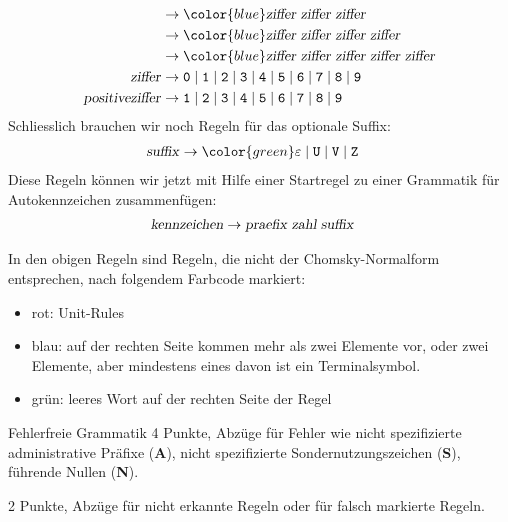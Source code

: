 \begin{loesung}
\begin{teilaufgaben}
\begin{align*}
&\rightarrow
{\color{blue}
\text{\textsl{ziffer}}\;
\text{\textsl{ziffer}}\;
\text{\textsl{ziffer}}}
\\
&\rightarrow
{\color{blue}
\text{\textsl{ziffer}}\;
\text{\textsl{ziffer}}\;
\text{\textsl{ziffer}}\;
\text{\textsl{ziffer}}}
\\
&\rightarrow
{\color{blue}
\text{\textsl{ziffer}}\;
\text{\textsl{ziffer}}\;
\text{\textsl{ziffer}}\;
\text{\textsl{ziffer}}\;
\text{\textsl{ziffer}}}
\\
\text{\textsl{ziffer}}
&\rightarrow
{\tt 0}\mid 
{\tt 1}\mid 
{\tt 2}\mid 
{\tt 3}\mid 
{\tt 4}\mid 
{\tt 5}\mid 
{\tt 6}\mid 
{\tt 7}\mid 
{\tt 8}\mid 
{\tt 9}
\\
\text{\textsl{positiveziffer}}
&\rightarrow
{\tt 1}\mid 
{\tt 2}\mid 
{\tt 3}\mid 
{\tt 4}\mid 
{\tt 5}\mid 
{\tt 6}\mid 
{\tt 7}\mid 
{\tt 8}\mid 
{\tt 9}
\\
\end{align*}
Schliesslich brauchen wir noch Regeln für das optionale Suffix:
\begin{align*}
\text{\textsl{suffix}}
&\rightarrow{\color{green}\varepsilon} \mid 
{\tt U} \mid 
{\tt V} \mid 
{\tt Z}
\end{align*}
Diese Regeln können wir jetzt mit Hilfe einer Startregel zu einer
Grammatik für Autokennzeichen zusammenfügen:
\begin{align*}
\text{\textsl{kennzeichen}}&\rightarrow
\text{\textsl{praefix}}\;\text{\textsl{zahl}}\;\text{\textsl{suffix}}
\end{align*}
\item In den obigen Regeln sind Regeln, die nicht der Chomsky-Normalform
entsprechen, nach folgendem Farbcode markiert:
\begin{itemize}
\item {\color{red} rot}: Unit-Rules
\item {\color{blue} blau}: auf der rechten Seite kommen mehr als
zwei Elemente vor, oder zwei Elemente, aber mindestens eines davon
ist ein Terminalsymbol.
\item {\color{green} grün}: leeres Wort auf der rechten Seite der Regel
\qedhere
\end{itemize}
\end{teilaufgaben}
\end{loesung}

\begin{bewertung}
\begin{teilaufgaben}
\item Fehlerfreie Grammatik 4 Punkte, Abzüge für Fehler wie
nicht spezifizierte administrative Präfixe ({\bf A}), nicht spezifizierte
Sondernutzungszeichen ({\bf S}), führende Nullen ({\bf N}).
\item 2 Punkte, Abzüge für nicht erkannte Regeln oder für falsch
markierte Regeln.
\end{teilaufgaben}
\end{bewertung}

